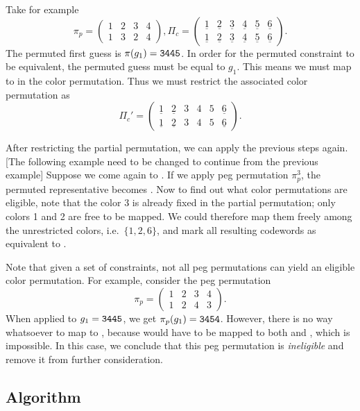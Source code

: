 Take for example 
\[
\pi_p = 
\begin{pmatrix}
1 & 2 & 3 & 4 \\
1 & 3 & 2 & 4
\end{pmatrix} , 
\Pi_c = 
\begin{pmatrix}
\underline{1} & \underline{2} & \underline{3} & \underline{4} & \underline{5} & \underline{6} \\
\underline{1} & \underline{2} & \underline{3} & \underline{4} & \underline{5} & \underline{6} 
\end{pmatrix} .
\] 
The permuted first guess is $\pi(g_1) = \texttt{3445}$. In order for the permuted constraint to be equivalent, the permuted guess must be equal to $g_1$. This means we must map  to  in the color permutation. Thus we must restrict the associated color permutation as
\[
\Pi_c' = 
\begin{pmatrix}
\underline{1} & \underline{2} & 3 & 4 & 5 & \underline{6} \\
\underline{1} & \underline{2} & 3 & 4 & 5  & \underline{6} 
\end{pmatrix} .
\]

After restricting the partial permutation, we can apply the previous steps again. 
[The following example need to be changed to continue from the previous example] Suppose we come again to . If we apply peg permutation $\pi_p^3$, the permuted representative becomes . Now to find out what color permutations are eligible, note that the color 3 is already fixed in the partial permutation; only colors 1 and 2 are free to be mapped. We could therefore map them freely among the unrestricted colors, i.e.\ $\{1, 2, 6\}$, and mark all resulting codewords as equivalent to .

Note that given a set of constraints, not all peg permutations can yield an eligible color permutation. For example, consider the peg permutation
\[
\pi_p = 
\begin{pmatrix}
1 & 2 & 3 & 4 \\
1 & 2 & 4 & 3
\end{pmatrix} .
\]
When applied to $g_1 = \texttt{3445}$, we get $\pi_p(g_1) = \texttt{3454}$. However, there is no way whatsoever to map  to , because  would have to be mapped to both  and , which is impossible. In this case, we conclude that this peg permutation is \emph{ineligible} and remove it from further consideration.

\subsection{Algorithm}

